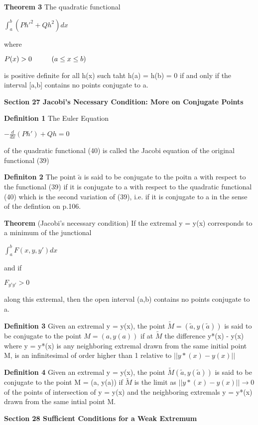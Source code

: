 \documentclass{article}
\newcommand\tab[1][1cm]{\hspace*{#1}}
\begin{document}
\textbf {Theorem 3} The quadratic functional
\begin{center}
$\int_a^b (Ph'^2 + Qh^2) dx$
\end{center}
where 
\begin{center}
$P(x) > 0 \tab (a \leq x \leq b)$
\end{center}
is positive definite for all h(x) such taht h(a) = h(b) = 0 if and only if the interval [a,b] contains no points conjugate to a.

\textbf {Section 27 Jacobi's Necessary Condition: More on Conjugate Points}

\textbf {Definition 1} The Euler Equation
\begin{center}
$-\frac{d}{dx} (Ph') + Qh = 0$
\end{center}
of the quadratic functional (40) is called the Jacobi equation of the original functional (39)

\textbf {Definiton 2} The point $\tilde{a}$ is said to be conjugate to the poitn a with respect to the functional (39) if it is conjugate to a with respect to the quadratic functional (40) which is the second variation of (39), i.e. if it is conjugate to a in the sense of the defintion on p.106. 

\textbf {Theorem} (Jacobi's necessary condition) If the extremal y = y(x) corresponds to a minimum of the junctional 
\begin{center}
$\int_a^b F(x, y, y') dx$
\end{center}
and if
\begin{center}
$F_{y'y'} > 0$
\end{center}
along this extremal, then the open interval (a,b) contains no points conjugate to a.

\textbf {Definition 3} Given an extremal y = y(x), the point $\tilde{M} = (\tilde{a}, y(\tilde{a}))$ is said to be conjugate to the point $M = (a, y(a))$ if at $\tilde{M}$ the difference y*(x) - y(x) where y = y*(x) is any neighboring extremal drawn from the same initial point M, is an infinitesimal of order higher than 1 relative to $||y*(x) - y(x)||$

\textbf {Definition 4} Given an extremal y = y(x), the point $\tilde{M} (\tilde{a}, y(\tilde{a}))$ is said to be conjugate to the point M = (a, y(a)) if $\tilde{M}$ is the limit as $||y*(x) - y(x)|| \to 0$ of the points of intersection of y = y(x) and the neighboring extremals y = y*(x) drawn from the same intial point M.

\textbf {Section 28 Sufficient Conditions for a Weak Extremum}
\end{document}
